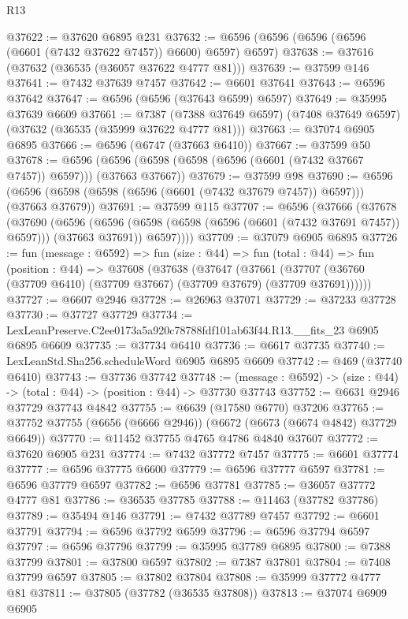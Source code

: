 \begin{lexlean}{R13}
\begin{coremodule}
@37622 := @37620 @6895 @231
@37632 := @6596 (@6596 (@6596 (@6596 (@6601 (@7432 @37622 @7457)) @6600) @6597) @6597)
@37638 := @37616 (@37632 (@36535 (@36057 @37622 @4777 @81)))
@37639 := @37599 @146
@37641 := @7432 @37639 @7457
@37642 := @6601 @37641
@37643 := @6596 @37642
@37647 := @6596 (@6596 (@37643 @6599) @6597)
@37649 := @35995 @37639 @6609
@37661 := @7387
    (@7388 @37649 @6597)
    (@7408 @37649 @6597)
    (@37632 (@36535 (@35999 @37622 @4777 @81)))
@37663 := @37074 @6905 @6895
@37666 := @6596 (@6747 (@37663 @6410))
@37667 := @37599 @50
@37678 := @6596 (@6596 (@6598 (@6598 (@6596 (@6601 (@7432 @37667 @7457)) @6597))) (@37663 @37667))
@37679 := @37599 @98
@37690 := @6596 (@6596 (@6598 (@6598 (@6596 (@6601 (@7432 @37679 @7457)) @6597))) (@37663 @37679))
@37691 := @37599 @115
@37707 := @6596
    (@37666
      (@37678
        (@37690
          (@6596
            (@6596 (@6598 (@6598 (@6596 (@6601 (@7432 @37691 @7457)) @6597))) (@37663 @37691))
            @6597))))
@37709 := @37079 @6905 @6895
@37726 := fun (message : @6592) =>
  fun (size : @44) =>
  fun (total : @44) =>
  fun (position : @44) =>
  @37608
    (@37638
      (@37647
        (@37661 (@37707 (@36760 (@37709 @6410) (@37709 @37667) (@37709 @37679) (@37709 @37691))))))
@37727 := @6607 @2946
@37728 := @26963 @37071
@37729 := @37233 @37728
@37730 := @37727 @37729
@37734 := LexLeanPreserve.C2ee0173a5a920c78788fdf101ab63f44.R13.__fits_23 @6905 @6895 @6609
@37735 := @37734 @6410
@37736 := @6617 @37735
@37740 := LexLeanStd.Sha256.scheduleWord @6905 @6895 @6609
@37742 := @469 (@37740 @6410)
@37743 := @37736 @37742
@37748 := (message : @6592) -> (size : @44) -> (total : @44) -> (position : @44) -> @37730 @37743
@37752 := @6631 @2946 @37729 @37743 @4842
@37755 := @6639 (@17580 @6770) @37206
@37765 := @37752 @37755 (@6656 (@6666 @2946)) (@6672 (@6673 (@6674 @4842) @37729 @6649))
@37770 := @11452 @37755 @4765 @4786 @4840 @37607
@37772 := @37620 @6905 @231
@37774 := @7432 @37772 @7457
@37775 := @6601 @37774
@37777 := @6596 @37775 @6600
@37779 := @6596 @37777 @6597
@37781 := @6596 @37779 @6597
@37782 := @6596 @37781
@37785 := @36057 @37772 @4777 @81
@37786 := @36535 @37785
@37788 := @11463 (@37782 @37786)
@37789 := @35494 @146
@37791 := @7432 @37789 @7457
@37792 := @6601 @37791
@37794 := @6596 @37792 @6599
@37796 := @6596 @37794 @6597
@37797 := @6596 @37796
@37799 := @35995 @37789 @6895
@37800 := @7388 @37799
@37801 := @37800 @6597
@37802 := @7387 @37801
@37804 := @7408 @37799 @6597
@37805 := @37802 @37804
@37808 := @35999 @37772 @4777 @81
@37811 := @37805 (@37782 (@36535 @37808))
@37813 := @37074 @6909 @6905

\end{coremodule}
\end{lexlean}
